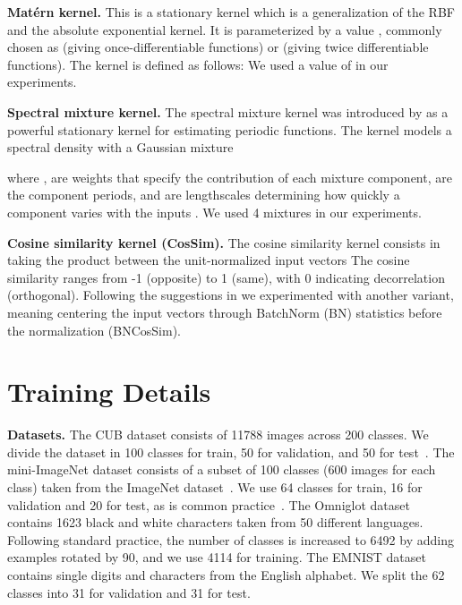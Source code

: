 \documentclass{article}
\begin{document}
\textbf{Mat\'ern kernel.} This is a stationary kernel which is a generalization of the RBF and the absolute exponential kernel. It is parameterized by a value , commonly chosen as  (giving once-differentiable functions) or  (giving twice differentiable functions). The kernel is defined as follows:
\label{eq_kernel_matern}
We used a value of  in our experiments.

\textbf{Spectral mixture kernel.} The spectral mixture kernel was introduced by \citet{wilson2013gaussian} as a powerful stationary kernel for estimating periodic functions. The kernel models a spectral density with a Gaussian mixture

where ,  are weights that specify the contribution of each mixture component,  are the component periods, and  are lengthscales determining how quickly a component varies with the inputs . We used 4 mixtures in our experiments.

\textbf{Cosine similarity kernel (CosSim).} The cosine similarity kernel consists in taking the product between the unit-normalized input vectors
\label{eq_kernel_cosine_similarity}
The cosine similarity ranges from -1 (opposite) to 1 (same), with 0 indicating decorrelation (orthogonal). Following the suggestions in \citet{wang2019simpleshot} we experimented with another variant,  meaning centering the input vectors through BatchNorm (BN) statistics \cite{ioffe2015batch} before the normalization (BNCosSim).

\section{Training Details}
\label{appendix:training_details}
\FloatBarrier

\textbf{Datasets.} The CUB dataset \citep{wah2011caltech} consists of  11788 images across 200 classes. We divide the dataset in 100 classes for train, 50 for validation, and 50 for test~\citep{hilliard2018few, chen2019closerfewshot}. The mini-ImageNet dataset \citep{ravi2017optimization} consists of a subset of 100 classes (600 images for each class) taken from the ImageNet dataset~\citep{russakovsky2015imagenet}. We use 64 classes for train, 16 for validation and 20 for test, as is common practice~\citep{ravi2017optimization, chen2019closerfewshot}. The Omniglot dataset \citep{lake2011one} contains 1623 black and white characters taken from 50 different languages. Following standard practice, the number of classes is increased to 6492 by adding examples rotated by 90, and we use 4114 for training. The EMNIST dataset~\citep{cohen2017emnist} contains single digits and characters from the English alphabet. We split the 62 classes into 31 for validation and 31 for test.
\end{document}
